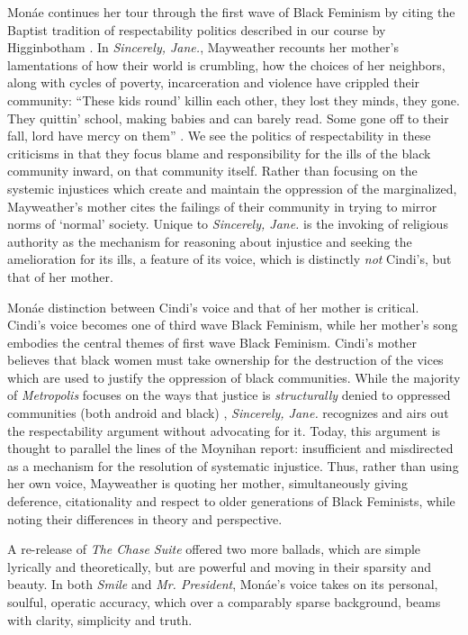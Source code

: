 \documentclass[a4paper, 11pt]{article} %
\begin{document}
Mon\'ae continues her tour through the first wave of Black Feminism by citing the Baptist tradition of respectability politics described in our course by Higginbotham \cite{higginbotham}.
In \emph{Sincerely, Jane.}, Mayweather recounts her mother's lamentations of how their world is crumbling, how the choices of her neighbors, along with cycles of poverty, incarceration and violence have crippled their community:
``These kids round' killin each other, they lost they minds, they gone. They quittin' school, making babies and can barely read. Some gone off to their fall, lord have mercy on them'' \cite{sincerelyjane}.
We see the politics of respectability in these criticisms in that they focus blame and responsibility for the ills of the black community inward, on that community itself.
Rather than focusing on the systemic injustices which create and maintain the oppression of the marginalized, Mayweather's mother cites the failings of their community in trying to mirror norms of `normal' society\cite{sincerelyjane}.
Unique to \emph{Sincerely, Jane.} is the invoking of religious authority as the mechanism for reasoning about injustice and seeking the amelioration for its ills, a feature of its voice, which is distinctly \emph{not} Cindi's, but that of her mother.

Mon\'ae distinction between Cindi's voice and that of her mother is critical. 
Cindi's voice becomes one of third wave Black Feminism, while her mother's song embodies the central themes of first wave Black Feminism.
Cindi's mother believes that black women must take ownership for the destruction of the vices which are used to justify the oppression of black communities. 
While the majority of \emph{Metropolis} focuses on the ways that justice is \emph{structurally} denied to oppressed communities (both android and black) \cite{queen}, \emph{Sincerely, Jane.} recognizes and airs out the respectability argument without advocating for it.
Today, this argument is thought to parallel the lines of the Moynihan report: insufficient and misdirected as a mechanism for the resolution of systematic injustice.
Thus, rather than using her own voice, Mayweather is quoting her mother, simultaneously giving deference, citationality and respect to older generations of Black Feminists, while noting their differences in theory and perspective.

A re-release of \emph{The Chase Suite} offered two more ballads, which are simple lyrically and theoretically, but are powerful and moving in their sparsity and beauty.
In both \emph{Smile} and \emph{Mr. President}, Mon\'ae's voice takes on its personal, soulful, operatic accuracy, which over a comparably sparse background, beams with clarity, simplicity and truth.
\end{document}

